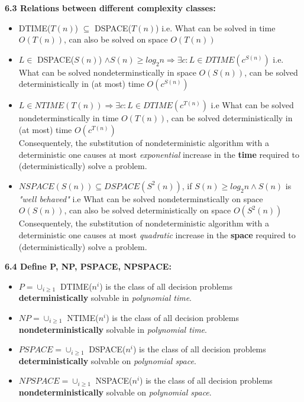 \documentclass{article}
\begin{document}
\begin{multicols}{2}
	\textbf{6.3 Relations between different complexity classes:}
	\begin{itemize}
		\setlength\itemsep{-0.4em}
		\item DTIME($T(n)$) $\subseteq$ DSPACE($T(n)$) \small{i.e. What can be solved in time $O(T(n))$, can also be solved on space $O(T(n))$}
		\item $L \in$ DSPACE($S(n)$) $\wedge S(n) \geq log_2 n \Rightarrow \exists c: L \in DTIME(c^{S(n)})$ \small{i.e. What can be solved nondeterminstically in space $O(S(n))$, can be solved deterministically in (at most) time $O(c^{S(n)})$}
		\item $L \in NTIME (T(n)) \Rightarrow \exists c: L \in DTIME(c^{T(n)})$ \small{i.e What can be solved nondeterminstically in time $O(T(n))$, can be solved deterministically in (at most) time $O(c^{T(n)})$}\\
		      Consequentely, the substitution of nondeterministic algorithm with a deterministic one causes at most \textit{exponential} increase in the \textbf{time} required to (deterministically) solve a problem.
		\item $NSPACE(S(n)) \subseteq DSPACE(S^2(n))$, if $S(n) \geq log_2 n \wedge S(n)$ is \textit{"well behaved"} \small{i.e What can be solved nondeterminstically on space $O(S(n))$, can also be solved deterministically on space $O(S^2(n))$} \\
		      Consequentely, the substitution of nondeterministic algorithm with a deterministic one causes at most \textit{quadratic} increase in the \textbf{space} required to (deterministically) solve a problem.
	\end{itemize}

	\textbf{6.4 Define P, NP, PSPACE, NPSPACE:}
	\begin{itemize}
		\setlength\itemsep{-0.4em}
		\item $P = \cup_{i \geq 1}$ DTIME($n^i$) is the class of all decision problems \textbf{deterministically} solvable in \textit{polynomial time}.
		\item $NP = \cup_{i \geq 1}$ NTIME($n^i$) is the class of all decision problems \textbf{nondeterministically} solvable in \textit{polynomial time}.
		\item $PSPACE = \cup_{i \geq 1}$ DSPACE($n^i$) is the class of all decision problems \textbf{deterministically} solvable on \textit{polynomial space}.
		\item $NPSPACE= \cup_{i \geq 1}$ NSPACE($n^i$) is the class of all decision problems \textbf{nondeterministically} solvable on \textit{polynomial space}.
	\end{itemize}


\end{multicols}
\end{document}
